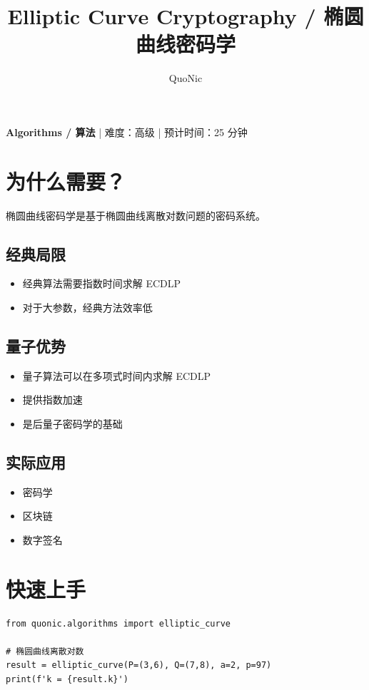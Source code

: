 \documentclass[12pt,a4paper]{article}
\title{Elliptic Curve Cryptography / 椭圆曲线密码学}
\author{QuoNic}
\date{}
\begin{document}
\maketitle

\begin{center}
\textbf{Algorithms / 算法} | 难度：高级 | 预计时间：25 分钟
\end{center}

\tableofcontents
\newpage

\section{为什么需要？}

椭圆曲线密码学是基于椭圆曲线离散对数问题的密码系统。

\subsection{经典局限}
\begin{itemize}
  \item 经典算法需要指数时间求解 ECDLP
  \item 对于大参数，经典方法效率低
\end{itemize}

\subsection{量子优势}
\begin{itemize}
  \item 量子算法可以在多项式时间内求解 ECDLP
  \item 提供指数加速
  \item 是后量子密码学的基础
\end{itemize}

\subsection{实际应用}
\begin{itemize}
  \item 密码学
  \item 区块链
  \item 数字签名
\end{itemize}

\section{快速上手}

\begin{verbatim}
from quonic.algorithms import elliptic_curve

# 椭圆曲线离散对数
result = elliptic_curve(P=(3,6), Q=(7,8), a=2, p=97)
print(f'k = {result.k}')
\end{verbatim}
\end{document}
